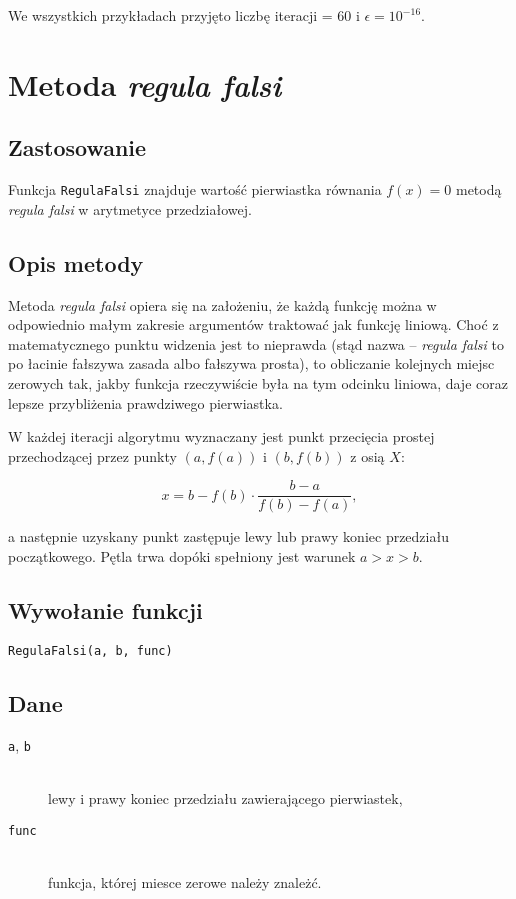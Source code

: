 \documentclass[12pt]{article}
\begin{document}
			We wszystkich przykładach przyjęto liczbę iteracji = 60 i $\epsilon = 10^{-16}$.


	\section{Metoda \textsl{regula falsi}}
		\subsection{Zastosowanie}
  		Funkcja \texttt{RegulaFalsi} znajduje wartość pierwiastka równania
  		$f(x) = 0$ metodą \textsl{regula falsi} w arytmetyce przedziałowej.

		\subsection{Opis metody}
  		Metoda \textsl{regula falsi} opiera się na założeniu, że każdą funkcję
  		można w odpowiednio małym zakresie argumentów traktować jak funkcję liniową.
      Choć z matematycznego punktu widzenia jest to nieprawda (stąd nazwa --
      \textsl{regula falsi} to po łacinie fałszywa zasada albo fałszywa prosta),
      to obliczanie kolejnych miejsc zerowych tak, jakby funkcja
      rzeczywiście była na tym odcinku liniowa, daje coraz lepsze przybliżenia
      prawdziwego pierwiastka.

      W każdej iteracji algorytmu wyznaczany jest punkt przecięcia prostej
      przechodzącej przez punkty $(a, f(a))$ i $(b, f(b))$ z osią $X$:

      \begin{equation*}
        x = b - f(b) \cdot \frac{b - a}{f(b) - f(a)},
      \end{equation*}

      a następnie uzyskany punkt zastępuje lewy lub prawy koniec przedziału początkowego.
      Pętla trwa dopóki spełniony jest warunek $a > x > b$.

    \subsection{Wywołanie funkcji}
  		\texttt{RegulaFalsi(a, b, func)}

  	\subsection{Dane}
  		\begin{description}
				\item[\texttt{a}, \texttt{b}] \hfill\\ lewy i prawy koniec przedziału zawierającego pierwiastek,
				\item[\texttt{func}] \hfill\\ funkcja, której miesce zerowe należy znależć.
			\end{description}
\end{document}
